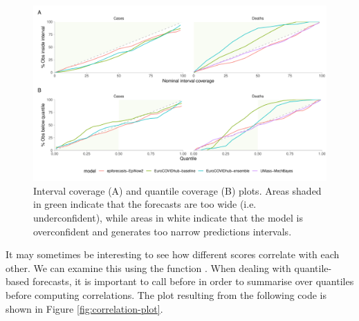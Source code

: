 \documentclass[
]{jss}
\begin{document}
\begin{CodeChunk}
\begin{figure}[!h]

{\centering \includegraphics[width=1\linewidth]{manuscript_files/figure-latex/coverage-1} 

}

\caption[Interval coverage (A) and quantile coverage (B) plots]{Interval coverage (A) and quantile coverage (B) plots. Areas shaded in green indicate that the forecasts are too wide (i.e. underconfident), while areas in white indicate that the model is overconfident and generates too narrow predictions intervals.}\label{fig:coverage}
\end{figure}
\end{CodeChunk}

It may sometimes be interesting to see how different scores correlate
with each other. We can examine this using the function
. When dealing with quantile-based forecasts, it is
important to call  before 
in order to summarise over quantiles before computing correlations. The
plot resulting from the following code is shown in Figure
\ref{fig:correlation-plot}.
\end{document}
